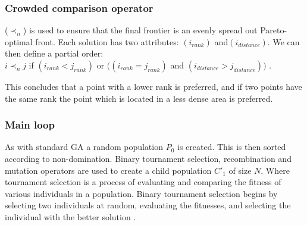 \documentclass[10pt, conference, compsocconf]{IEEEtran}
\begin{document}
\subsubsection{Crowded comparison operator}
($\prec_n$) is used to ensure that the final frontier is an evenly spread out Pareto-optimal front. Each solution has two attributes: $(i_{rank})$ and$(i_{distance})$. 
We can then define a partial order:\\	
$i\prec_nj$ if $(i_{rank}<j_{rank})$ or $((i_{rank}=j_{rank})$ and  $(i_{distance}>j_{distance}))$ \cite{Valkanas2014}.

This concludes that a point with a lower rank is preferred, and if two points have the same rank the point which is located in a less dense area is preferred.

\subsubsection{Main loop}
As with standard GA a random population $P_{0}$ is created. This is then  sorted according to non-domination. Binary tournament selection, recombination and mutation operators are used to create a child population $C'_{1}$ of size $N$. Where tournament selection is a process of evaluating and comparing the fitness of various individuals in a population. Binary tournament selection begins by selecting two individuals at random, evaluating the fitnesses, and selecting the individual with the better solution \cite{AbdRahman2016}.
\end{document}

